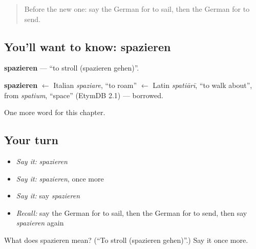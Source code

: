 \begin{quote}
Before the new one: say the German for to sail, then the German for to send.
\end{quote}

\subsection*{You'll want to know: spazieren}
\textbf{spazieren} — \textquotedblleft{}to stroll (spazieren gehen)\textquotedblright{}.

\begin{cousinweb}
\textbf{spazieren} $\leftarrow$ Italian \emph{spaziare}, \textquotedblleft{}to roam\textquotedblright{} $\leftarrow$ Latin \emph{spatiārī}, \textquotedblleft{}to walk about\textquotedblright{}, from \emph{spatium}, \textquotedblleft{}space\textquotedblright{} (EtymDB 2.1) — borrowed.
\end{cousinweb}

\begin{grammarlens}[title={What you've built}]
One more word for this chapter.
\end{grammarlens}

\subsection*{Your turn}
\begin{itemize}
\raggedright
  \item \emph{Say it:} \emph{spazieren}
  \item \emph{Say it:} \emph{spazieren}, once more
  \item \emph{Say it:} say \emph{spazieren}
  \item \emph{Recall:} say the German for to sail, then the German for to send, then say \emph{spazieren} again
\end{itemize}

\begin{tcolorbox}[breakable,colback=teal!4,colframe=teal!35!black,title={Before you move on}]
What does spazieren mean? (\textquotedblleft{}To stroll (spazieren gehen)\textquotedblright{}.) Say it once more.
\end{tcolorbox}
